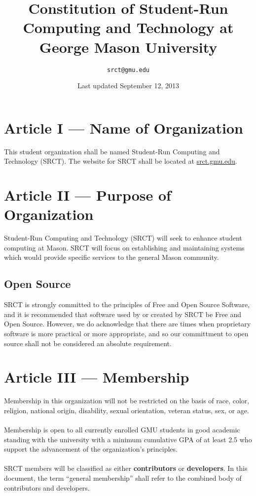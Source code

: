 \documentclass{article}
\title{\bfseries Constitution of Student-Run Computing and Technology at 
George Mason University}
\date{Last updated September 12, 2013}
\author{\texttt{srct@gmu.edu}}
\begin{document}
  
  \maketitle
  
  \section{Article I --- Name of Organization}
  This student organization shall be named Student-Run Computing and 
  Technology (SRCT). The website for SRCT shall be located at 
  \url{srct.gmu.edu}.
  
  \section{Article II --- Purpose of Organization}
  Student-Run Computing and Technology (SRCT) will seek to enhance 
  student computing at Mason. SRCT will focus on establishing and 
  maintaining systems which would provide specific services to the 
  general Mason community.
  
  \subsection{Open Source}
  SRCT is strongly committed to the principles of Free and Open Source
  Software, and it is recommended that software used by or created by SRCT be
  Free and Open Source. However, we do acknowledge that there are times when
  proprietary software is more practical or more appropriate, and so our
  committment to open source shall not be considered an absolute requirement.
  
  \section{Article III --- Membership}
  Membership in this organization will not be restricted on the basis of 
  race, color, religion, national origin, disability, sexual 
  orientation, veteran status, sex, or age. 
  \\ \\
  Membership is open to all currently enrolled GMU students in good 
  academic standing with the university with a minimum cumulative GPA of 
  at least 2.5 who support the advancement of the organization's 
  principles.
  \\ \\
  SRCT members will be classified as either \textbf{contributors} or 
  \textbf{developers}. In this document, the term ``general membership''
  shall refer to the combined body of contributors and developers.
  
\end{document}
